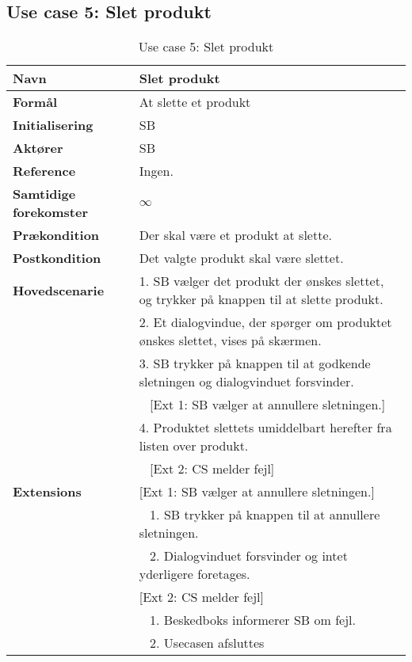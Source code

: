\subsection{Use case 5: Slet produkt}


\begin{table}[H]
\begin{tabularx}{\textwidth}{|l|X|}
\hline
\textbf{Navn}					& Slet produkt \\\hline
\textbf{Formål}					& At slette et produkt \\\hline
\textbf{Initialisering}			& \gls{SB} \\\hline
\textbf{Aktører}				& \gls{SB} \\\hline
\textbf{Reference}				& Ingen. \\\hline								
\textbf{Samtidige forekomster}	& $\infty$ \\\hline
\textbf{Prækondition}			& Der skal være et produkt at slette. \\\hline
\textbf{Postkondition}			& Det valgte produkt skal være slettet. \\
\hline
\textbf{Hovedscenarie}			& 1. \gls{SB} vælger det produkt der ønskes slettet, og trykker på knappen til at slette produkt.\\												
								& 2. Et dialogvindue, der spørger om produktet ønskes slettet, vises på skærmen.\\
								& 3. \gls{SB} trykker på knappen til at godkende sletningen og dialogvinduet forsvinder.\\
								& ~ [Ext 1: \gls{SB} vælger at annullere sletningen.]\\
								& 4. Produktet slettets umiddelbart herefter fra listen over produkt.\\
								& ~ [Ext 2: \gls{CS} melder fejl]\\
\hline
\textbf{Extensions}				& [Ext 1: \gls{SB} vælger at annullere sletningen.]\\
								& ~ 1. \gls{SB} trykker på knappen til at annullere sletningen.\\
								& ~ 2. Dialogvinduet forsvinder og intet yderligere foretages.\\
								& [Ext 2: \gls{CS} melder fejl] \\
								& ~ 1. Beskedboks informerer \gls{SB} om fejl. \\
								& ~ 2. Usecasen afsluttes \\\hline
\hline
\end{tabularx}
\caption{Use case 5: Slet produkt}
\label{tab:UCsp}
\end{table}